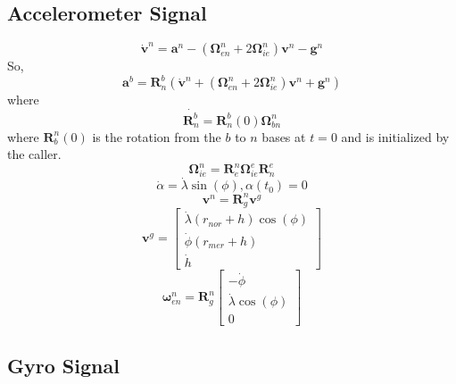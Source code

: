 \documentclass[a4paper]{report}
\numberwithin{equation}{chapter}
\newcommand{\mat}[1]{\boldsymbol{#1}}
\begin{document}
\subsection[Accelerometer Signal]{Accelerometer Signal}

\begin{equation}
\dot{\mat{v}}^n = \mat{a}^n - \left( \mat{\Omega}^n_{en} + 2 \mat{\Omega}^n_{ie} \right) \mat{v}^n - \mat{g}^n
\end{equation}
So,
\begin{equation}
\mat{a}^b = \mat{R}^b_n \left( \dot{\mat{v}}^n + \left( \mat{\Omega}^n_{en} + 2 \mat{\Omega}^n_{ie} \right) \mat{v}^n + \mat{g}^n \right)
\end{equation}
where
\begin{equation}
\dot{\mat{R}^b_n} = \mat{R}^b_n \left( 0 \right) \mat{\Omega}^n_{bn}
\end{equation}
where $\mat{R}^n_b \left( 0 \right)$ is the rotation from the $b$ to $n$ bases at $t = 0$ and is initialized by the caller.
\begin{equation}
\mat{\Omega}^n_{ie} = \mat{R}^n_e \mat{\Omega}^e_{ie} \mat{R}^e_n
\end{equation}
\begin{equation}
\dot{\alpha} = \dot{\lambda} \sin \left( \phi \right), \alpha \left( t_0 \right) = 0
\end{equation}
\begin{equation}
\mat{v}^n = \mat{R}^n_g \mat{v}^g
\end{equation}
\begin{equation}
\mat{v}^g =
\begin{bmatrix}
\dot{\lambda} \left( r_{nor} + h \right) \cos \left( \phi \right) \\
\dot{\phi} \left( r_{mer} + h \right) \\
\dot{h}
\end{bmatrix}
\end{equation}
\begin{equation}
\mat{\omega}^n_{en} = \mat{R}^n_g
\begin{bmatrix}
-\dot{\phi} \\
\dot{\lambda} \cos \left( \phi \right) \\
0
\end{bmatrix}
\end{equation}

\subsection[Gyro Signal]{Gyro Signal}
\end{document}
